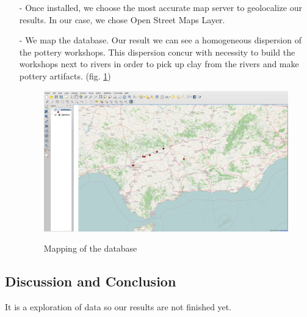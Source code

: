 \documentclass[10pt,a4paper]{article}
\begin{document}
\begin{itemize}
\item[-] Once installed, we choose the most accurate map server to geolocalize our results. In our case, we chose Open Street Maps Layer. 
\item[-] We map the database. Our result we can see a homogeneous dispersion of the pottery workshops. This dispersion concur with necessity to build the workshops next to rivers in order to pick up clay from the rivers and make pottery artifacts.   (fig. \ref{gismap})

\begin{figure}[hdp]
  \centering
\includegraphics[scale=0.30]{gismap.png}
\label{gismap}
\caption{Mapping of the database}
\end{figure}

\end{itemize}

\subsection{Discussion and Conclusion}

It is a exploration of data so our results are not finished yet. 









































 
\end{document}
